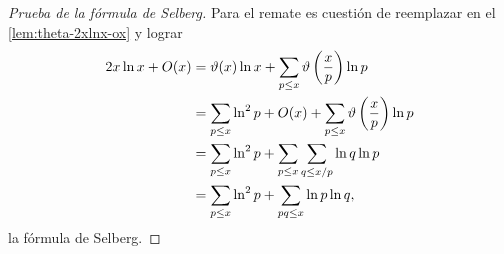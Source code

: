 \begin{proof}[Prueba de la f\'ormula de Selberg]
  Para el remate es cuesti\'on de reemplazar en el \cref{lem:theta-2xlnx-ox} y lograr  
  \begin{align*}
    2x\ln x + O(x)
    &= \vartheta(x)\ln x
    + \sum_{p \leq x} \vartheta\left( \frac{x}{p} \right)\ln p  \\
    &= \sum_{p \leq x} \ln^2 p + O(x)
    + \sum_{p \leq x} \vartheta\left( \frac{x}{p} \right)\ln p  \\
    &= \sum_{p \leq x} \ln^2 p
    + \sum_{p \leq x} \sum_{q \leq x/p} \ln q \ln p  \\
    &= \sum_{p \leq x} \ln^2 p + \sum_{pq \leq x} \ln p \ln q,
  \end{align*}
  la f\'ormula de Selberg.
\end{proof}

